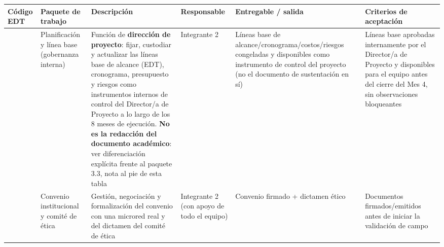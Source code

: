 \documentclass[11pt,a4paper]{article}
\begin{document}
{\small
\begin{longtable}[]{@{}
  >{\raggedright\arraybackslash}p{}
  >{\raggedright\arraybackslash}p{}
  >{\raggedright\arraybackslash}p{}
  >{\raggedright\arraybackslash}p{}
  >{\raggedright\arraybackslash}p{}
  >{\raggedright\arraybackslash}p{}@{}}
\toprule\noalign{}
\begin{minipage}[b]{\linewidth}\raggedright
Código EDT
\end{minipage} & \begin{minipage}[b]{\linewidth}\raggedright
Paquete de trabajo
\end{minipage} & \begin{minipage}[b]{\linewidth}\raggedright
Descripción
\end{minipage} & \begin{minipage}[b]{\linewidth}\raggedright
Responsable
\end{minipage} & \begin{minipage}[b]{\linewidth}\raggedright
Entregable / salida
\end{minipage} & \begin{minipage}[b]{\linewidth}\raggedright
Criterios de aceptación
\end{minipage} \\
\midrule\noalign{}
\endhead
\bottomrule\noalign{}
\endlastfoot
1.1 & Planificación y línea base (gobernanza interna) & Función de \textbf{dirección de proyecto}: fijar, custodiar y actualizar las líneas base de alcance (EDT), cronograma, presupuesto y riesgos como instrumentos internos de control del Director/a de Proyecto a lo largo de los 8 meses de ejecución. \textbf{No es la redacción del documento académico}: ver diferenciación explícita frente al paquete 3.3, nota al pie de esta tabla & Integrante 2 & Líneas base de alcance/cronograma/costos/riesgos congeladas y disponibles como instrumento de control del proyecto (no el documento de sustentación en sí) & Líneas base aprobadas internamente por el Director/a de Proyecto y disponibles para el equipo antes del cierre del Mes 4, sin observaciones bloqueantes \\
1.2 & Convenio institucional y comité de ética & Gestión, negociación y formalización del convenio con una microred real y del dictamen del comité de ética & Integrante 2 (con apoyo de todo el equipo) & Convenio firmado + dictamen ético & Documentos firmados/emitidos antes de iniciar la validación de campo \\

\end{longtable}}
\end{document}

